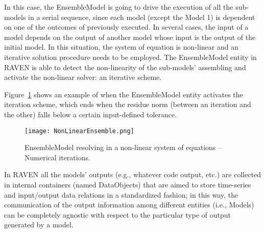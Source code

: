 In this case, the EnsembleModel is going to drive the execution of all the sub-models in a serial sequence, 
since each model (except the Model 1) is dependent on one of the outcomes of previously executed.
In several cases, the input of a model depends on the output of another model whose input is the output 
of the initial model. In this situation, the system of equation is non-linear and an iterative solution 
procedure needs to be employed. The EnsembleModel entity in RAVEN is able to detect the non-linearity of 
the sub-models’ assembling and activate the non-linear solver: an iterative scheme. 

Figure~\ref{fig:exampleEnsembleModelNonLinear} shows an example 
of when the EnsembleModel entity activates the iteration scheme, which ends when the residue norm 
(between an iteration and the other) falls below a certain input-defined tolerance.

 \begin{figure}
    \centering
    \centerline{\texttt{[image: NonLinearEnsemble.png]}} 
    \caption{EnsembleModel resolving in a non-linear system of equations – Numerical iterations.}
    \label{fig:exampleEnsembleModelNonLinear}
\end{figure}

In RAVEN all the models’ outputs (e.g., whatever code output, etc.) are collected in internal containers 
(named DataObjects) that are aimed to store time-series and input/output data relations in a standardized 
fashion; in this way, the communication of the output information among different entities (i.e., Models) 
can be completely agnostic with respect to the particular type of output generated by a 
model.

 